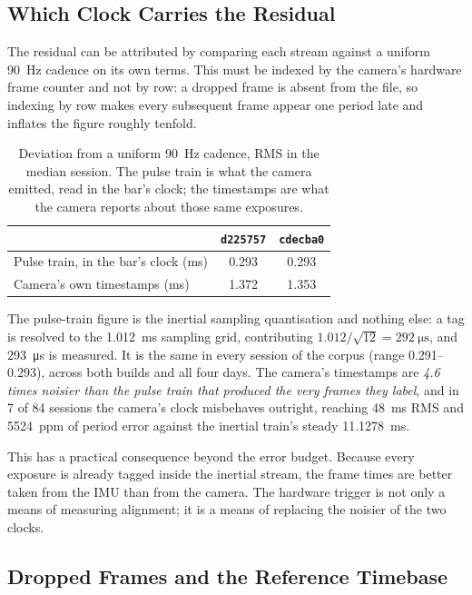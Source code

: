 \subsection{Which Clock Carries the Residual}\label{sec:sync_budget}

The residual can be attributed by comparing each stream against a uniform
\SI{90}{\hertz} cadence on its own terms. This must be indexed by the camera's hardware
frame counter and not by row: a dropped frame is absent from the file, so indexing by row
makes every subsequent frame appear one period late and inflates the figure roughly
tenfold.

\begin{table}[t]
  \centering
  \caption{Deviation from a uniform \SI{90}{\hertz} cadence, RMS in the median session.
           The pulse train is what the camera emitted, read in the bar's clock; the
           timestamps are what the camera reports about those same exposures.}
  \label{tab:cadence}
  \begin{tabular}{lcc}
    \hline
    & \texttt{d225757} & \texttt{cdecba0} \\
    \hline
    Pulse train, in the bar's clock (ms) & 0.293 & 0.293 \\
    Camera's own timestamps (ms)         & 1.372 & 1.353 \\
    \hline
  \end{tabular}
\end{table}

The pulse-train figure is the inertial sampling quantisation and nothing else: a tag is
resolved to the \SI{1.012}{\milli\second} sampling grid, contributing
$1.012/\sqrt{12}=\SI{292}{\micro\second}$, and \SI{293}{\micro\second} is measured. It is
the same in every session of the corpus (range 0.291--0.293), across both builds and all
four days. The camera's timestamps are \emph{4.6 times noisier than the pulse train that
produced the very frames they label}, and in 7 of 84 sessions the camera's clock
misbehaves outright, reaching \SI{48}{\milli\second} RMS and \SI{5524}{ppm} of period
error against the inertial train's steady \SI{11.1278}{\milli\second}.

This has a practical consequence beyond the error budget. Because every exposure is
already tagged inside the inertial stream, the frame times are better taken from the IMU
than from the camera. The hardware trigger is not only a means of measuring alignment; it
is a means of replacing the noisier of the two clocks.

\subsection{Dropped Frames and the Reference Timebase}\label{sec:dropped_frames}

